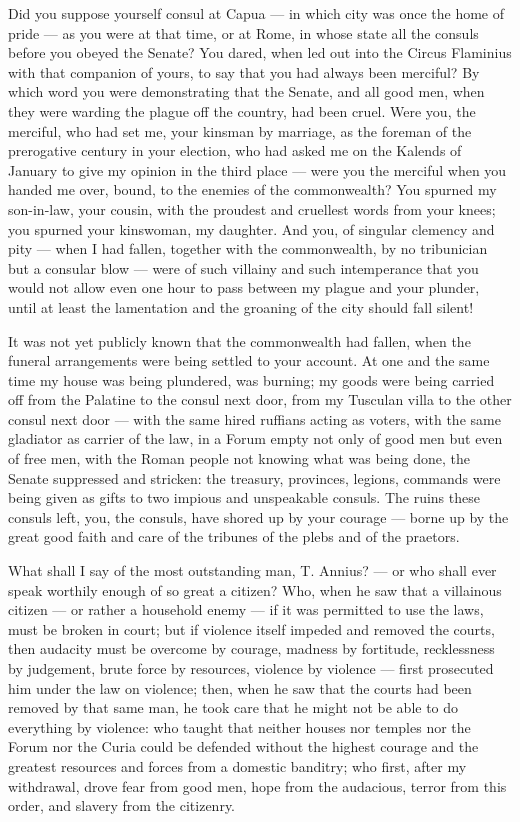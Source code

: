  Did you suppose yourself consul at Capua --- in which city was once the home of pride --- as you were at that time, or at Rome, in whose state all the consuls before you obeyed the Senate? You dared, when led out into the Circus Flaminius with that companion of yours, to say that you had always been merciful? By which word you were demonstrating that the Senate, and all good men, when they were warding the plague off the country, had been cruel. Were you, the merciful, who had set me, your kinsman by marriage, as the foreman of the prerogative century in your election, who had asked me on the Kalends of January to give my opinion in the third place --- were you the merciful when you handed me over, bound, to the enemies of the commonwealth? You spurned my son-in-law, your cousin, with the proudest and cruellest words from your knees; you spurned your kinswoman, my daughter. And you, of singular clemency and pity --- when I had fallen, together with the commonwealth, by no tribunician but a consular blow --- were of such villainy and such intemperance that you would not allow even one hour to pass between my plague and your plunder, until at least the lamentation and the groaning of the city should fall silent!

 It was not yet publicly known that the commonwealth had fallen, when the funeral arrangements were being settled to your account. At one and the same time my house was being plundered, was burning; my goods were being carried off from the Palatine to the consul next door, from my Tusculan villa to the other consul next door --- with the same hired ruffians acting as voters, with the same gladiator as carrier of the law, in a Forum empty not only of good men but even of free men, with the Roman people not knowing what was being done, the Senate suppressed and stricken: the treasury, provinces, legions, commands were being given as gifts to two impious and unspeakable consuls. The ruins these consuls left, you, the consuls, have shored up by your courage --- borne up by the great good faith and care of the tribunes of the plebs and of the praetors.

 What shall I say of the most outstanding man, T. Annius? --- or who shall ever speak worthily enough of so great a citizen? Who, when he saw that a villainous citizen --- or rather a household enemy --- if it was permitted to use the laws, must be broken in court; but if violence itself impeded and removed the courts, then audacity must be overcome by courage, madness by fortitude, recklessness by judgement, brute force by resources, violence by violence --- first prosecuted him under the law on violence; then, when he saw that the courts had been removed by that same man, he took care that he might not be able to do everything by violence: who taught that neither houses nor temples nor the Forum nor the Curia could be defended without the highest courage and the greatest resources and forces from a domestic banditry; who first, after my withdrawal, drove fear from good men, hope from the audacious, terror from this order, and slavery from the citizenry.

